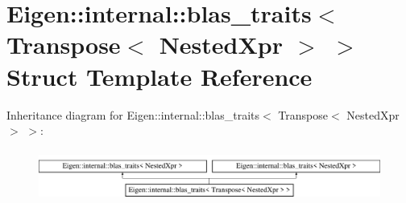 \hypertarget{struct_eigen_1_1internal_1_1blas__traits_3_01_transpose_3_01_nested_xpr_01_4_01_4}{}\section{Eigen\+:\+:internal\+:\+:blas\+\_\+traits$<$ Transpose$<$ Nested\+Xpr $>$ $>$ Struct Template Reference}
\label{struct_eigen_1_1internal_1_1blas__traits_3_01_transpose_3_01_nested_xpr_01_4_01_4}
Inheritance diagram for Eigen\+:\+:internal\+:\+:blas\+\_\+traits$<$ Transpose$<$ Nested\+Xpr $>$ $>$\+:\begin{figure}[H]
\begin{center}
\leavevmode
\includegraphics[height=1.696970cm]{struct_eigen_1_1internal_1_1blas__traits_3_01_transpose_3_01_nested_xpr_01_4_01_4}
\end{center}
\end{figure}

